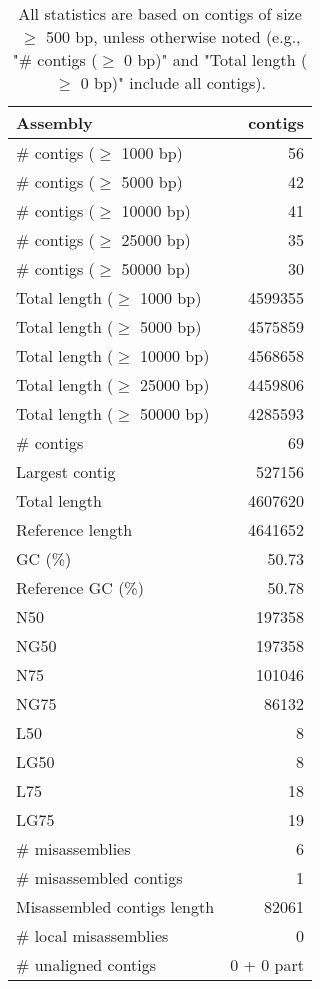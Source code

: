 \documentclass[12pt,a4paper]{article}
\begin{document}
\begin{table}[ht]
\begin{center}
\caption{All statistics are based on contigs of size $\geq$ 500 bp, unless otherwise noted (e.g., "\# contigs ($\geq$ 0 bp)" and "Total length ($\geq$ 0 bp)" include all contigs).}
\begin{tabular}{|l*{1}{|r}|}
\hline
Assembly & contigs \\ \hline
\# contigs ($\geq$ 1000 bp) & 56 \\ \hline
\# contigs ($\geq$ 5000 bp) & 42 \\ \hline
\# contigs ($\geq$ 10000 bp) & 41 \\ \hline
\# contigs ($\geq$ 25000 bp) & 35 \\ \hline
\# contigs ($\geq$ 50000 bp) & 30 \\ \hline
Total length ($\geq$ 1000 bp) & 4599355 \\ \hline
Total length ($\geq$ 5000 bp) & 4575859 \\ \hline
Total length ($\geq$ 10000 bp) & 4568658 \\ \hline
Total length ($\geq$ 25000 bp) & 4459806 \\ \hline
Total length ($\geq$ 50000 bp) & 4285593 \\ \hline
\# contigs & 69 \\ \hline
Largest contig & 527156 \\ \hline
Total length & 4607620 \\ \hline
Reference length & 4641652 \\ \hline
GC (\%) & 50.73 \\ \hline
Reference GC (\%) & 50.78 \\ \hline
N50 & 197358 \\ \hline
NG50 & 197358 \\ \hline
N75 & 101046 \\ \hline
NG75 & 86132 \\ \hline
L50 & 8 \\ \hline
LG50 & 8 \\ \hline
L75 & 18 \\ \hline
LG75 & 19 \\ \hline
\# misassemblies & 6 \\ \hline
\# misassembled contigs & 1 \\ \hline
Misassembled contigs length & 82061 \\ \hline
\# local misassemblies & 0 \\ \hline
\# unaligned contigs & 0 + 0 part \\ \hline

\end{tabular}
\end{center}
\end{table}
\end{document}
